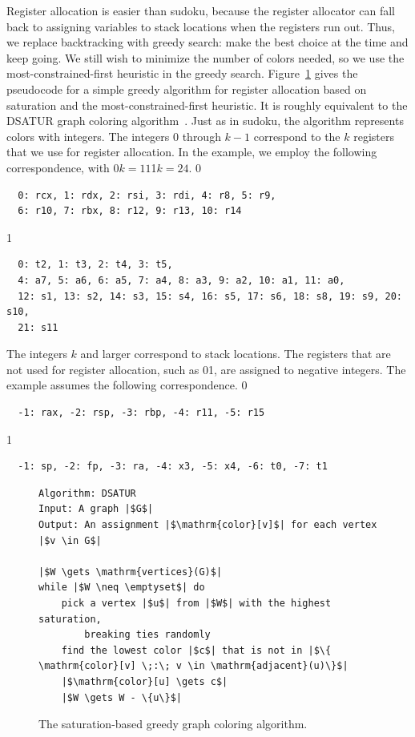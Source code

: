 \documentclass[7x10]{TimesAPriori_MIT}%
\def\xeightysixEd{0}
\def\riscvEd{1}
\def\architecture{1}
\newcommand\ifriscv[1]{\if\architecture\riscvEd{#1}\fi}
\newcommand\ifxeightsix[1]{\if\architecture\xeightysixEd{#1}\fi}
\numberwithin{theorem}{chapter}
\numberwithin{definition}{chapter}
\numberwithin{equation}{chapter}
\begin{document}
Register allocation is easier than sudoku, because the
register allocator can fall back to assigning variables to stack
locations when the registers run out. Thus, we replace
backtracking with greedy search: make the best choice at the time and
keep going. We still wish to minimize the number of colors needed, so
we use the most-constrained-first heuristic in the greedy search.
Figure~\ref{fig:satur-algo} gives the pseudocode for a simple greedy
algorithm for register allocation based on saturation and the
most-constrained-first heuristic. It is roughly equivalent to the
DSATUR graph coloring algorithm~\citep{Brelaz:1979eu}.  Just as in
sudoku, the algorithm represents colors with integers. The integers
$0$ through $k-1$ correspond to the $k$ registers that we use for
register allocation. In the example, we employ the following
correspondence, with \ifxeightsix{$k=11$}\ifriscv{$k=24$}.
\if\architecture\xeightysixEd
\begin{lstlisting}
  0: rcx, 1: rdx, 2: rsi, 3: rdi, 4: r8, 5: r9,
  6: r10, 7: rbx, 8: r12, 9: r13, 10: r14
\end{lstlisting}
\fi
\if\architecture\riscvEd
\begin{lstlisting}
  0: t2, 1: t3, 2: t4, 3: t5,
  4: a7, 5: a6, 6: a5, 7: a4, 8: a3, 9: a2, 10: a1, 11: a0,
  12: s1, 13: s2, 14: s3, 15: s4, 16: s5, 17: s6, 18: s8, 19: s9, 20: s10,
  21: s11
\end{lstlisting}
\fi
The integers $k$ and larger correspond to stack locations. The
registers that are not used for register allocation, such as
\ifxeightsix{\RAX}\ifriscv{}, are assigned to negative integers. The example assumes the following correspondence.
\if\architecture\xeightysixEd
\begin{lstlisting}
  -1: rax, -2: rsp, -3: rbp, -4: r11, -5: r15
\end{lstlisting}
\fi
\if\architecture\riscvEd
\begin{lstlisting}
  -1: sp, -2: fp, -3: ra, -4: x3, -5: x4, -6: t0, -7: t1
\end{lstlisting}
\fi

\begin{figure}[btp]
\begin{tcolorbox}[colback=white]
  \centering
\begin{lstlisting}[basicstyle=\rmfamily,deletekeywords={for,from,with,is,not,in,find},morekeywords={while},columns=fullflexible]
Algorithm: DSATUR
Input: A graph |$G$|
Output: An assignment |$\mathrm{color}[v]$| for each vertex |$v \in G$|

|$W \gets \mathrm{vertices}(G)$|
while |$W \neq \emptyset$| do
    pick a vertex |$u$| from |$W$| with the highest saturation,
        breaking ties randomly
    find the lowest color |$c$| that is not in |$\{ \mathrm{color}[v] \;:\; v \in \mathrm{adjacent}(u)\}$|
    |$\mathrm{color}[u] \gets c$|
    |$W \gets W - \{u\}$|
\end{lstlisting}
\end{tcolorbox}
\caption{The saturation-based greedy graph coloring algorithm.}
  \label{fig:satur-algo}
\end{figure}
\end{document}
